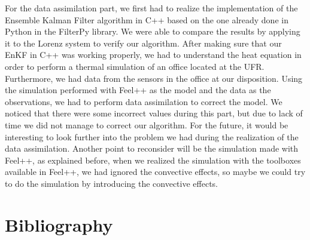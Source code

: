 \documentclass[12pt]{article}
\begin{document}
	\noindent For the data assimilation part, we first had to realize the implementation of the Ensemble Kalman Filter algorithm in C++ based on the one already done in Python in the FilterPy library. We were able to compare the results by applying it to the Lorenz system to verify our algorithm. After making sure that our EnKF in C++ was working properly, we had to understand the heat equation in order to perform a thermal simulation of an office located at the UFR. Furthermore, we had data from the sensors in the office at our disposition. Using the simulation performed with Feel++ as the model and the data as the observations, we had to perform data assimilation to correct the model. We noticed that there were some incorrect values during this part, but due to lack of time we did not manage to correct our algorithm. For the future, it would be interesting to look further into the problem we had during the realization of the data assimilation. Another point to reconsider will be the simulation made with Feel++, as explained before, when we realized the simulation with the toolboxes available in Feel++, we had ignored the convective effects, so maybe we could try to do the simulation by introducing the convective effects. 
	

	
	\newpage
	
	\section*{Bibliography}
	
	\printbibliography[heading=subbibintoc,keyword=ref,title={References}]
	
	\newpage
	
	\printbibliography[heading=subbibintoc,keyword=doc,title={Documentation}]
	
	\appendix
	
		
	
\end{document}
